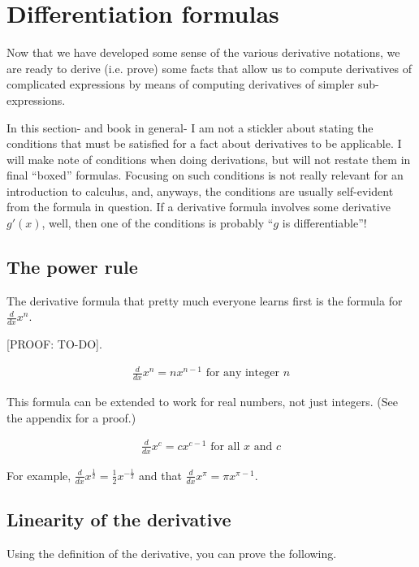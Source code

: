 \section*{Differentiation formulas}

Now that we have developed some sense of the various derivative notations, we are ready to derive (i.e. prove) some facts that allow us to compute derivatives of complicated expressions by means of computing derivatives of simpler sub-expressions.

In this section- and book in general- I am not a stickler about stating the conditions that must be satisfied for a fact about derivatives to be applicable. I will make note of conditions when doing derivations, but will not restate them in final ``boxed'' formulas. Focusing on such conditions is not really relevant for an introduction to calculus, and, anyways, the conditions are usually self-evident from the formula in question. If a derivative formula involves some derivative $g'(x)$, well, then one of the conditions is probably ``$g$ is differentiable''!

\subsection*{The power rule}

The derivative formula that pretty much everyone learns first is the formula for $\frac{d}{dx} x^n$.

[PROOF: TO-DO].

\begin{align*}
    \frac{d}{dx} x^n = nx^{n - 1} \text{ for any integer $n$}
\end{align*}

This formula can be extended to work for real numbers, not just integers. (See the appendix for a proof.)

\begin{align*}
    \boxed
    {
        \frac{d}{dx} x^c = cx^{c - 1} \text{ for all $x$ and $c$}
    }
\end{align*}

For example, $\frac{d}{dx} x^{\frac{1}{2}} = \frac{1}{2}x^{-\frac{1}{2}}$ and that $\frac{d}{dx} x^\pi = \pi x^{\pi - 1}$.

\subsection*{Linearity of the derivative}

Using the definition of the derivative, you can prove the following.

